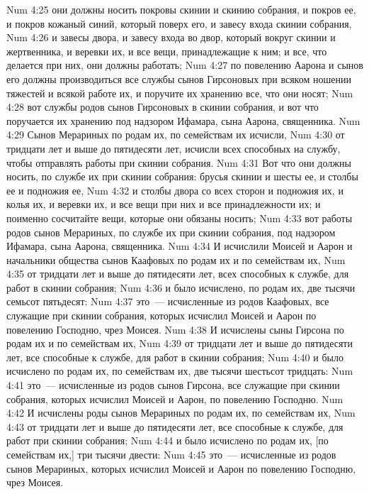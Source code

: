 \vs Num 4:25 они должны носить покровы скинии и скинию собрания, и покров ее, и покров кожаный синий, который поверх его, и завесу входа скинии собрания,
\vs Num 4:26 и завесы двора, и завесу входа во двор, который вокруг скинии и жертвенника, и веревки их, и все вещи, принадлежащие к ним; и все, что делается при них, они должны работать;
\vs Num 4:27 по повелению Аарона и сынов его должны производиться все службы сынов Гирсоновых при всяком ношении тяжестей и всякой работе их, и поручите их хранению все, что они носят;
\vs Num 4:28 вот службы родов сынов Гирсоновых в скинии собрания, и вот что поручается их хранению под надзором Ифамара, сына Аарона, священника.
\vs Num 4:29 Сынов Мерариных по родам их, по семействам их исчисли,
\vs Num 4:30 от тридцати лет и выше до пятидесяти лет, исчисли всех способных на службу, чтобы отправлять работы при скинии собрания.
\vs Num 4:31 Вот что они должны носить, по службе их при скинии собрания: брусья скинии и шесты ее, и столбы ее и подножия ее,
\vs Num 4:32 и столбы двора со всех сторон и подножия их, и колья их, и веревки их, и все вещи при них и все принадлежности их; и поименно сосчитайте вещи, которые они обязаны носить;
\vs Num 4:33 вот работы родов сынов Мерариных, по службе их при скинии собрания, под надзором Ифамара, сына Аарона, священника.
\vs Num 4:34 И исчислили Моисей и Аарон и начальники общества сынов Каафовых по родам их и по семействам их,
\vs Num 4:35 от тридцати лет и выше до пятидесяти лет, всех способных к службе, для работ в скинии собрания;
\vs Num 4:36 и было исчислено, по родам их, две тысячи семьсот пятьдесят:
\vs Num 4:37 это~--- исчисленные из родов Каафовых, все служащие при скинии собрания, которых исчислил Моисей и Аарон по повелению Господню,  чрез Моисея.
\vs Num 4:38 И исчислены сыны Гирсона по родам их и по семействам их,
\vs Num 4:39 от тридцати лет и выше до пятидесяти лет, все способные к службе, для работ в скинии собрания;
\vs Num 4:40 и было исчислено по родам их, по семействам их, две тысячи шестьсот тридцать:
\vs Num 4:41 это~--- исчисленные из родов сынов Гирсона, все служащие при скинии собрания, которых исчислил Моисей и Аарон, по повелению Господню.
\vs Num 4:42 И исчислены роды сынов Мерариных по родам их, по семействам их,
\vs Num 4:43 от тридцати лет и выше до пятидесяти лет, все способные к службе, для работ при скинии собрания;
\vs Num 4:44 и было исчислено по родам их, [по семействам их,] три тысячи двести:
\vs Num 4:45 это~--- исчисленные из родов сынов Мерариных, которых исчислил Моисей и Аарон по повелению Господню,  чрез Моисея.
